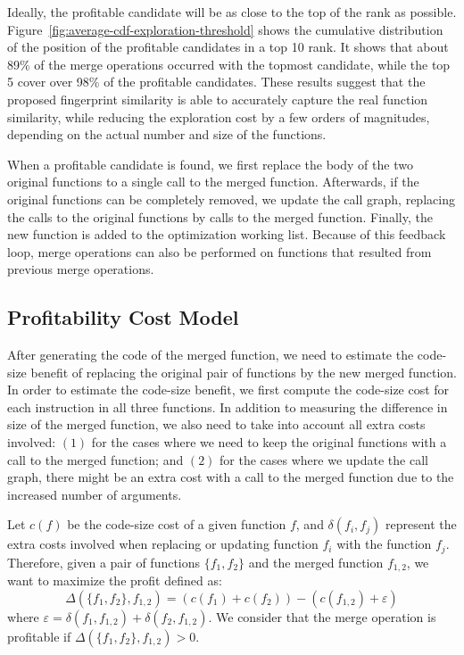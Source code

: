 Ideally, the profitable candidate will be as close to the top of the rank as
possible.
Figure~\ref{fig:average-cdf-exploration-threshold} shows the cumulative
distribution of the position of the profitable candidates in a top 10 rank.
It shows that about 89\% of the merge operations occurred with the topmost
candidate, while the top 5 cover over 98\% of the profitable candidates.
These results suggest that the proposed fingerprint similarity is able to
accurately capture the real function similarity, while reducing the exploration
cost by a few orders of magnitudes, depending on the actual number and size of
the functions.

When a profitable candidate is found, we first replace the body of the two
original functions to a single call to the merged function.
Afterwards, if the original functions can be completely removed, we update the
call graph, replacing the calls to the original functions by calls to the
merged function.
Finally, the new function is added to the optimization working list.
Because of this feedback loop, merge operations can also be performed on
functions that resulted from previous merge operations.

\subsection{Profitability Cost Model}\label{sec:profit-model}

After generating the code of the merged function, we need to estimate the
code-size benefit of replacing the original pair of functions by the new merged
function.
In order to estimate the code-size benefit, we first compute the code-size cost
for each instruction in all three functions.
In addition to measuring the difference in size of the merged function, we also
need to take into account all extra costs involved:
$(1)$ for the cases where we need to keep the original functions with a call to
the merged function;
and $(2)$ for the cases where we update the call graph, there might be an extra
cost with a call to the merged function due to the increased number of arguments.

Let $c(f)$ be the code-size cost of a given function $f$, and
$\delta(f_i, f_j)$ represent the extra costs involved when replacing or
updating function $f_i$ with the function $f_j$.
Therefore, given a pair of functions $\{f_1,f_2\}$ and the merged function
$f_{1,2}$, we want to maximize the profit defined as:
\[
  \Delta(\{f_1,f_2\},f_{1,2}) = (c(f_1)+c(f_2)) - (c(f_{1,2}) + \varepsilon)
\]
where $\varepsilon = \delta(f_1, f_{1,2}) + \delta(f_2, f_{1,2})$.
We consider that the merge operation is profitable if $\Delta(\{f_1,f_2\},f_{1,2})>0$.

